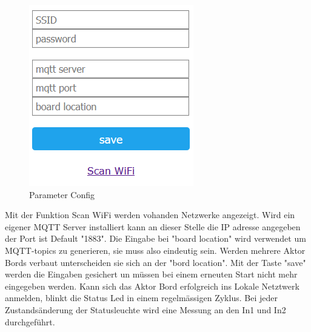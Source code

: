 \begin{figure}[H]
\begin{center}
\begin{minipage}[b]{.3\linewidth}
		\includegraphics[width=\textwidth]{graphics/Configportal2.PNG}
		\caption{Parameter Config}
	\end{minipage}
\end{center}
\end{figure}
Mit der Funktion Scan WiFi werden vohanden Netzwerke angezeigt. Wird ein eigener MQTT Server installiert kann an dieser Stelle die IP adresse angegeben der Port ist Default "1883". Die Eingabe bei "board location" wird verwendet um MQTT-topics zu generieren, sie muss also eindeutig sein. Werden mehrere Aktor Bords verbaut unterscheiden sie sich an der "bord location". Mit der Taste "save" werden die Eingaben gesichert un müssen bei einem erneuten Start nicht mehr eingegeben werden. Kann sich das Aktor Bord erfolgreich ins Lokale Netztwerk anmelden, blinkt die Status Led in einem regelmässigen Zyklus. Bei jeder Zustandsänderung der Statusleuchte wird eine Messung an den In1 und In2 durchgeführt. 

